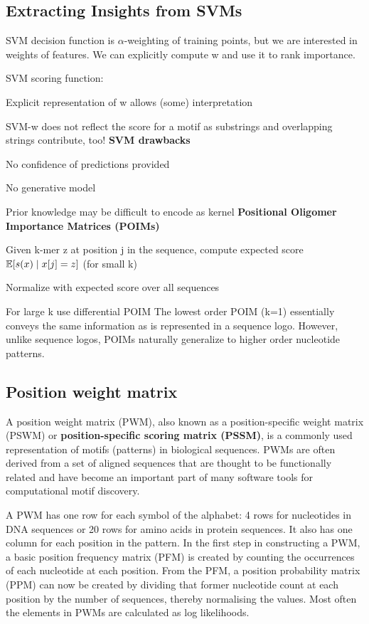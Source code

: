 \documentclass[12pt]{article}
\begin{document}
\subsection{Extracting Insights from SVMs}
\par SVM decision function is $\alpha$-weighting of training points, but we are interested in weights of features. We can explicitly compute w and use it to rank importance.
\par SVM scoring function:
\ulb
\item Explicit representation of w allows (some) interpretation
\item SVM-w does not reflect the score for a motif as substrings and overlapping strings contribute, too!
\ule
\textbf{SVM drawbacks}
\ulb
\item No confidence of predictions provided
\item No generative model
\item Prior knowledge may be difficult to encode as kernel
\ule
\textbf{Positional Oligomer Importance Matrices (POIMs)}
\ulb\item Given k-mer z at position j in the sequence, compute expected score $\mathbb{E} [ s(x)  \mid  x[j] = z ]$ (for small k)
\item Normalize with expected score over all sequences
\item For large k use differential POIM
\ule
The lowest order POIM (k=1) essentially conveys the same information as is represented in a sequence logo. However, unlike sequence logos, POIMs naturally generalize to higher order nucleotide patterns.

\subsection{Position weight matrix}
\par A position weight matrix (PWM), also known as a position-specific weight matrix (PSWM) or \textbf{position-specific scoring matrix (PSSM)}, is a commonly used representation of motifs (patterns) in biological sequences. PWMs are often derived from a set of aligned sequences that are thought to be functionally related and have become an important part of many software tools for computational motif discovery.
\par A PWM has one row for each symbol of the alphabet: 4 rows for nucleotides in DNA sequences or 20 rows for amino acids in protein sequences. It also has one column for each position in the pattern. In the first step in constructing a PWM, a basic position frequency matrix (PFM) is created by counting the occurrences of each nucleotide at each position. From the PFM, a position probability matrix (PPM) can now be created by dividing that former nucleotide count at each position by the number of sequences, thereby normalising the values. Most often the elements in PWMs are calculated as log likelihoods. 
\end{document}
